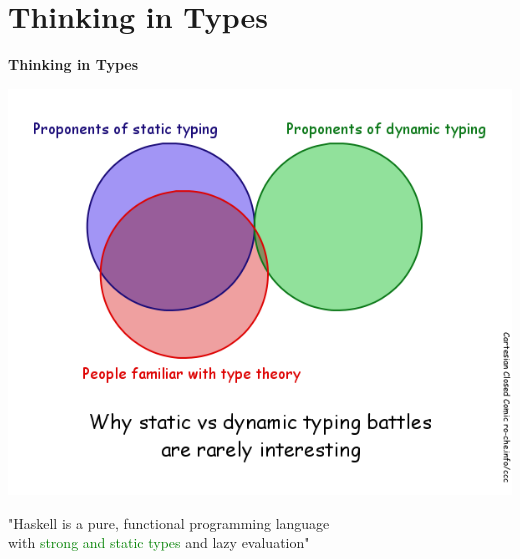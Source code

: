 \documentclass[unknownkeysallowed]{beamer}
\begin{document}
\section{Thinking in Types}
\begin{frame}

    \begin{center}
    \Large\textbf{Thinking in Types} \bigskip
    
    \includegraphics[scale=0.3]{typing.png} 
    \end{center}

\end{frame}


\begin{frame}
\begin{center}

  "Haskell is a pure, functional programming language \\ with \textcolor{green}{strong and static types} and lazy evaluation"
  
\end{center}
\end{frame}

\end{document}
